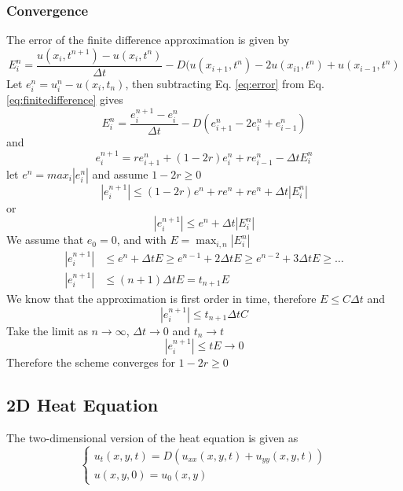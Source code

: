 \documentclass[11pt,a4paper,noindent]{article}
\begin{document}
\subsubsection{Convergence}
The error of the finite difference approximation is given by
\begin{equation} \label{eq:error}
E_i^n = \frac{u(x_i,t^{n+1})-u(x_i,t^{n})}{\Delta t} - D (u(x_{i+1},t^{n}) - 2u(x_{i1},t^{n}) + u(x_{i-1},t^{n})
\end{equation}
Let $e_i^n = u_i^n - u(x_i,t_{n})$, then subtracting Eq. \ref{eq:error} from Eq. \ref{eq:finitedifference} gives
\begin{equation}
E_i^n = \frac{e^{n+1}_i-e^{n}_i}{\Delta t} - D (e^n_{i+1} - 2e^n_{i} + e^n_{i-1})
\end{equation}
and
\begin{equation}
e^{n+1}_i = r e^n_{i+1} + (1-2r)e^n_{i} + r e^n_{i-1} - \Delta t E_i^n
\end{equation}
let $e^n = max_i|e_i^n|$ and assume $1-2r\geq 0$
\begin{equation}
|e_i^{n+1}| \leq (1-2r)e^n + re^n + re^n + \Delta t |E_i^n|
\end{equation}
or
\begin{equation}
|e_i^{n+1}| \leq e^n + \Delta t |E_i^n|
\end{equation}
We assume that $e_0=0$, and with $E = \max_{i,n}|E_i^n|$
\begin{align}
|e_i^{n+1}| &\leq e^n + \Delta t E \geq e^{n-1} + 2\Delta t E \geq e^{n-2} + 3\Delta t E \geq \ldots \\
|e_i^{n+1}| &\leq (n+1)\Delta t E = t_{n+1} E
\end{align}
We know that the approximation is first order in time, therefore $E \leq C \Delta t$ and
\begin{equation}
|e_i^{n+1}| \leq t_{n+1}\Delta t C
\end{equation}
Take the limit as $n \rightarrow \infty$, $\Delta t \rightarrow 0$ and $t_n \rightarrow t$
\begin{equation}
|e_i^{n+1}| \leq t E \rightarrow 0
\end{equation}
Therefore the scheme converges for $1-2r\geq 0$

\subsection{2D Heat Equation}
The two-dimensional version of the heat equation is given as
\begin{equation}\label{eq:diffusion2}
\left\lbrace \begin{array}{c}
u_t(x,y,t) = D (u_{xx}(x,y,t) + u_{yy}(x,y,t)) \\
u(x,y,0) = u_0(x,y)
\end{array}
\right.
\end{equation}
\end{document}
